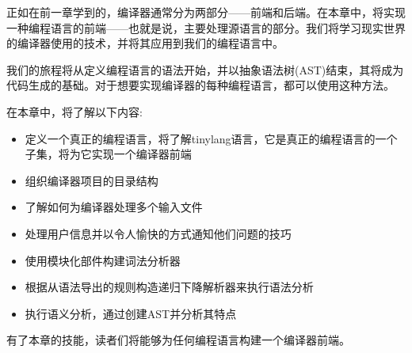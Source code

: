 正如在前一章学到的，编译器通常分为两部分——前端和后端。在本章中，将实现一种编程语言的前端——也就是说，主要处理源语言的部分。我们将学习现实世界的编译器使用的技术，并将其应用到我们的编程语言中。

我们的旅程将从定义编程语言的语法开始，并以抽象语法树(AST)结束，其将成为代码生成的基础。对于想要实现编译器的每种编程语言，都可以使用这种方法。

在本章中，将了解以下内容:

\begin{itemize}
\item
定义一个真正的编程语言，将了解tinylang语言，它是真正的编程语言的一个子集，将为它实现一个编译器前端

\item
组织编译器项目的目录结构

\item
了解如何为编译器处理多个输入文件

\item
处理用户信息并以令人愉快的方式通知他们问题的技巧

\item
使用模块化部件构建词法分析器

\item
根据从语法导出的规则构造递归下降解析器来执行语法分析

\item
执行语义分析，通过创建AST并分析其特点
\end{itemize}

有了本章的技能，读者们将能够为任何编程语言构建一个编译器前端。








